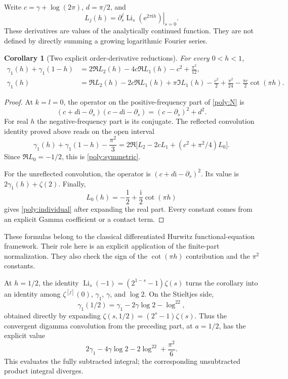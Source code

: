 \documentclass[11pt,letterpaper]{article}
\numberwithin{equation}{section}
\theoremstyle{plain}
\newtheorem{corollary}[theorem]{Corollary}
\theoremstyle{definition}
\theoremstyle{remark}
\newcommand{\numi}{\mathrm i}
\newcommand{\rme}{\mathrm e}
\newcommand{\rLi}{\operatorname{Li}}
\begin{document}
Write \(c=\gamma+\log(2\pi)\), \(d=\pi/2\), and
\[
 L_j(h)=\left.\partial_s^j
                 \rLi_s(\rme^{2\pi\numi h})\right|_{s=0}.
\]
These derivatives are values of the analytically continued function.
They are not defined by directly summing a growing logarithmic
Fourier series.

\begin{corollary}[Two explicit order-derivative reductions]
\label{poly:gamma1}
For every \(0<h<1\),
\begin{align}
 \gamma_1(h)+\gamma_1(1-h)
 &=2\Re L_2(h)-4c\Re L_1(h)-c^2+\frac{\pi^2}{12},
 \label{poly:symmetric}\\
 \gamma_1(h)
 &=\Re L_2(h)-2c\Re L_1(h)+\pi\Im L_1(h)
      -\frac{c^2}{2}+\frac{\pi^2}{24}
      -\frac{\pi c}{2}\cot(\pi h).
 \label{poly:individual}
\end{align}
\end{corollary}

\begin{proof}
At \(k=l=0\), the operator on the positive-frequency part of
\eqref{poly:N} is
\[
 (c+d\numi-\partial_s)(c-d\numi-\partial_s)
       =(c-\partial_s)^2+d^2 .
\]
For real \(h\) the negative-frequency part is its conjugate.
The reflected convolution identity proved above reads on the open
interval
\[
 \gamma_1(h)+\gamma_1(1-h)-\frac{\pi^2}{3}
 =2\Re\bigl[L_2-2cL_1+(c^2+\pi^2/4)L_0\bigr].
\]
Since \(\Re L_0=-1/2\), this is \eqref{poly:symmetric}.

For the unreflected convolution, the operator is
\((c+d\numi-\partial_s)^2\). Its value is
\(2\gamma_1(h)+\zeta(2)\). Finally,
\[
 L_0(h)=-\frac12+\frac{\numi}{2}\cot(\pi h)
\]
gives \eqref{poly:individual} after expanding the real part.
Every constant comes from an explicit Gamma coefficient or
a contact term.
\end{proof}

These formulas belong to the classical differentiated Hurwitz
functional-equation framework. Their role here is an explicit
application of the finite-part normalization. They also check the
sign of the \(\cot(\pi h)\) contribution and the \(\pi^2\) constants.

At \(h=1/2\), the identity
\(\rLi_s(-1)=(2^{1-s}-1)\zeta(s)\) turns the corollary into an identity
among \(\zeta^{[j]}(0)\), \(\gamma_1\), \(\gamma\), and \(\log2\).
On the Stieltjes side,
\[
 \gamma_1(1/2)=\gamma_1-2\gamma\log2-\log^22,
\]
obtained directly by expanding
\(\zeta(s,1/2)=(2^s-1)\zeta(s)\).
Thus the convergent digamma convolution from the preceding part,
at \(a=1/2\), has the explicit value
\begin{equation}\label{poly:half-convolution}
 2\gamma_1-4\gamma\log2-2\log^22+\frac{\pi^2}{6}.
\end{equation}
This evaluates the fully subtracted integral; the corresponding
unsubtracted product integral diverges.
\end{document}
